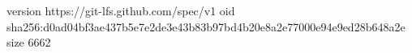 version https://git-lfs.github.com/spec/v1
oid sha256:d0ad04bf3ae437b5e7e2de3e43b83b97bd4b20e8a2e77000e94e9ed28b648a2e
size 6662
